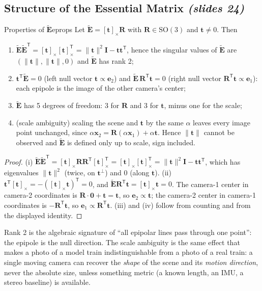 \documentclass[11pt,a4paper]{article}
\newcommand{\slr}[1]{\texorpdfstring{\emph{(slides #1)}}{(slides #1)}}
\newcommand{\SO}{\mathrm{SO}(3)}
\newcommand{\E}{\tilde{\bm E}}
\newcommand{\sk}[1]{[#1]_{\times}}
\newcommand{\norm}[1]{\lVert #1\rVert}
\newcommand{\tr}{^{\mathsf T}}
\begin{document}
\subsection{Structure of the Essential Matrix \slr{24}}
\begin{proposition}{Properties of $\E$}{eprops}
Let $\E=\sk{\bm t}\bm R$ with $\bm R\in\SO$ and $\bm t\neq0$. Then
\begin{enumerate}[nosep,label=(\roman*)]
\item $\E\E\tr=\sk{\bm t}\sk{\bm t}\tr=\norm{\bm t}^2\bm I-\bm t\bm t\tr$, hence the singular values of $\E$ are $(\norm{\bm t},\norm{\bm t},0)$ and $\E$ has rank 2;
\item $\bm t\tr\E=0$ (left null vector $\bm t\propto\bm e_2$) and $\E\,\bm R\tr\bm t=0$ (right null vector $\bm R\tr\bm t\propto\bm e_1$): each epipole is the image of the other camera's center;
\item $\E$ has 5 degrees of freedom: 3 for $\bm R$ and 3 for $\bm t$, minus one for the scale;
\item (scale ambiguity) scaling the scene and $\bm t$ by the same $\alpha$ leaves every image point unchanged, since $\alpha\bm x_2=\bm R(\alpha\bm x_1)+\alpha\bm t$. Hence $\norm{\bm t}$ cannot be observed and $\E$ is defined only up to scale, sign included.
\end{enumerate}
\end{proposition}
\begin{proof}
(i) $\E\E\tr=\sk{\bm t}\bm R\bm R\tr\sk{\bm t}\tr=\sk{\bm t}\sk{\bm t}\tr=\norm{\bm t}^2\bm I-\bm t\bm t\tr$, which has eigenvalues $\norm{\bm t}^2$ (twice, on $\bm t^\perp$) and $0$ (along $\bm t$).
(ii) $\bm t\tr\sk{\bm t}=-(\sk{\bm t}\bm t)\tr=0$, and $\E\bm R\tr\bm t=\sk{\bm t}\bm t=0$. The camera-1 center in camera-2 coordinates is $\bm R\cdot\bm 0+\bm t=\bm t$, so $\bm e_2\propto\bm t$; the camera-2 center in camera-1 coordinates is $-\bm R\tr\bm t$, so $\bm e_1\propto\bm R\tr\bm t$.
(iii) and (iv) follow from counting and from the displayed identity.
\end{proof}

\begin{intuition}
Rank 2 is the algebraic signature of ``all epipolar lines pass through one point'': the epipole is the null direction. The scale ambiguity is the same effect
that makes a photo of a model train indistinguishable from a photo of a real train: a single moving camera can recover the \emph{shape} of the scene and its \emph{motion direction}, never the absolute size, unless
something metric (a known length, an IMU, a stereo baseline) is available.
\end{intuition}
\end{document}
